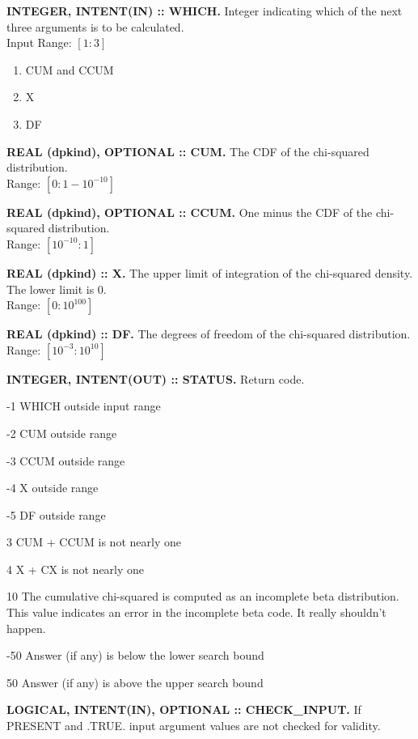 \documentclass[12pt,dvips]{article}
\newcommand{\range}[2]{\hfill Range: \ensuremath{\left[ #1:#2
\right]}\\}
\newcommand{\inrange}[2]{\hfill Input Range: \ensuremath{\left[ #1:#2
\right]}\\}
\newcommand{\sdf}{10^{-3}}
\newcommand{\bdf}{10^{10}}
\newcommand{\sprob}{10^{-10}}
\newcommand{\bprob}{1-\sprob}
\newcommand{\immense}{10^{100}}
\newcommand{\myitem}[1]{\item{\bf \color{Violet} #1 \normalcolor}}
\begin{document}
\begin{description}

\myitem{INTEGER, INTENT(IN)  :: WHICH.} Integer indicating  which of the
next three arguments is to be calculated.\\
\inrange{1}{3}
\begin{enumerate}
\item CUM and CCUM
\item X
\item DF
\end{enumerate}

\myitem{REAL (dpkind), OPTIONAL :: CUM.} The CDF of the chi-squared
distribution.\\
\range{0}{\bprob}

\myitem{REAL (dpkind), OPTIONAL :: CCUM.} One minus the CDF of the
chi-squared distribution.\\
\range{\sprob}{1}

\myitem{REAL (dpkind) :: X.}  The upper limit of integration of
the chi-squared density.  The lower limit is 0.\\
\range{0}{\immense}

\myitem{REAL (dpkind) :: DF.}  The degrees of freedom of the chi-squared
distribution.\\
\range{\sdf}{\bdf}

\myitem{INTEGER, INTENT(OUT) :: STATUS.} Return code.
\begin{description}
\item{-1}  WHICH outside input range
\item{-2}  CUM outside range
\item{-3}  CCUM outside range
\item{-4}  X outside range
\item{-5}  DF outside range
\item{3} CUM + CCUM is not nearly one
\item{4} X + CX is not nearly one
\item{10} The cumulative chi-squared is computed as an incomplete
beta distribution.  This value indicates an error in the incomplete
beta code.  It really shouldn't happen.
\item{-50} Answer (if any) is below the lower search bound
\item{50} Answer (if any) is above the upper search bound
\end{description}

\myitem{LOGICAL, INTENT(IN), OPTIONAL :: CHECK\_INPUT.}  If PRESENT
and .TRUE. input argument values are not checked for validity.

\end{description}
\end{document}
